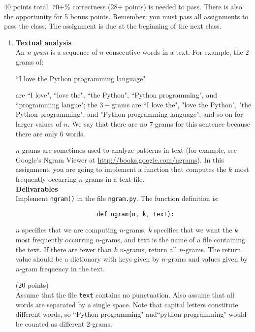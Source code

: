 \documentclass{article}
\newcounter{points}
\newcommand\setpoints[1]{\addtocounter{points}{#1}(#1 points)}
\begin{document}
\pagestyle{fancy}

40 points total.  70+\% correctness (28+ points) is needed to pass.  There is also the opportunity for 5 bonus points.  Remember: you must pass all assignments to pass the class.  The assignment is due at the beginning of the next class.

\begin{enumerate}
\item \textbf{Textual analysis} \\
An \emph{n-gram} is a sequence of $n$ consecutive words in a text.  For example, the $2$-grams of:
\begin{center}
 ``I love the Python programming language"
\end{center} are ``I love", ``love the", ``the Python", ``Python programming", and ``programming langue";  the $3-$grams are ``I love the", "love the Python", "the Python programming", and "Python programming language"; and so on for larger values of $n$.  We say that there are no $7$-grams for this sentence because there are only $6$ words.

$n$-grams are sometimes used to analyze patterns in text (for example, see Google's Ngram Viewer at \url{http://books.google.com/ngrams}).  In this assignment, you are going to implement a function that computes the $k$ most frequently occurring $n$-grams in a text file. \\

\textbf{Delivarables} \\
Implement \texttt{ngram()} in the file \texttt{ngram.py}.  The function definition is: \\

\begin{lstlisting}
                       def ngram(n, k, text):
\end{lstlisting}
$n$ specifies that we are computing $n$-grams, $k$ specifies that we want the $k$ most frequently occurring $n$-grams, and text is the name of a file containing the text.  If there are fewer than $k$ $n$-grams, return all $n$-grams.  The return value should be a dictionary with keys given by $n$-grams and values given by $n$-gram frequency in the text.  \setpoints{20} \\

Assume that the file \texttt{text} contains no punctuation.  Also assume that all words are separated by a single space. Note that capital letters constitute different words, so ``Python programming" and``python programming" would be counted as different 2-grams. \\


\end{enumerate}
\end{document}
